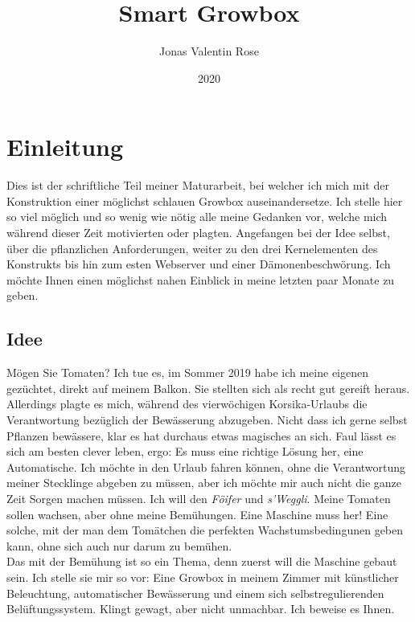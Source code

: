 \documentclass[12pt,titlepage,a4paper]{article}
\begin{document}
\begin{titlepage}
\title{Smart Growbox}
\date{2020}
\author{Jonas Valentin Rose}
\end{titlepage}
\maketitle 
\tableofcontents
\newpage
\section{Einleitung}
Dies ist der schriftliche Teil meiner Maturarbeit, bei welcher ich mich  mit der Konstruktion einer möglichst schlauen Growbox auseinandersetze. Ich stelle hier so viel möglich und so wenig wie nötig alle meine Gedanken vor, welche mich während dieser Zeit motivierten oder plagten. Angefangen bei der Idee selbst, über die pflanzlichen Anforderungen, weiter zu den drei Kernelementen des Konstrukts bis hin zum esten Webserver und einer Dämonenbeschwörung. Ich möchte Ihnen einen möglichst nahen Einblick in meine letzten paar Monate zu geben.

\subsection{Idee}
Mögen Sie Tomaten? Ich tue es, im Sommer 2019 habe ich meine eigenen gezüchtet, direkt auf meinem Balkon. Sie stellten sich als recht gut gereift heraus. Allerdings plagte es mich, während des vierwöchigen Korsika-Urlaubs die Verantwortung bezüglich der Bewässerung abzugeben. Nicht dass ich gerne selbst Pflanzen bewässere, klar es hat durchaus etwas magisches an sich. Faul lässt es sich am besten clever leben, ergo: Es muss eine richtige Lösung her, eine Automatische. Ich möchte in den Urlaub fahren können, ohne die Verantwortung meiner Stecklinge abgeben zu müssen, aber ich möchte mir auch nicht die ganze Zeit Sorgen machen müssen. Ich will den \textit{Föifer} und \textit{s'Weggli}. Meine Tomaten sollen wachsen, aber ohne meine Bemühungen. Eine Maschine muss her! Eine solche, mit der man dem Tomätchen die perfekten Wachstumsbedingunen geben kann, ohne sich auch nur darum zu bemühen. \\ Das mit der Bemühung ist so ein Thema, denn zuerst will die Maschine gebaut sein. Ich stelle sie mir so vor: Eine Growbox in meinem Zimmer mit künstlicher Beleuchtung, automatischer Bewässerung und einem sich selbstregulierenden Belüftungssystem. Klingt gewagt, aber nicht unmachbar. Ich beweise es Ihnen.
\end{document}
